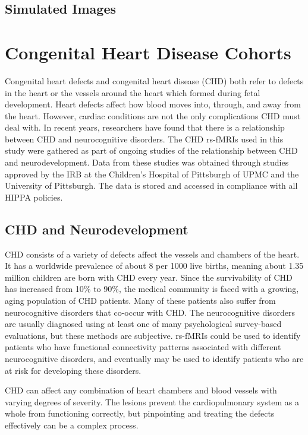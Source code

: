 \subsection{Simulated Images}

\section{Congenital Heart Disease Cohorts}

Congenital heart defects and congenital heart disease (CHD) both refer to defects in the heart or the vessels around the heart which formed during  fetal development. Heart defects affect how blood moves into, through, and away from the heart. However, cardiac conditions are not the only complications CHD must deal with. In recent years, researchers have found that there is a relationship between CHD and neurocognitive disorders. The CHD rs-fMRIs used in this study were gathered as part of ongoing studies of the relationship between CHD and neurodevelopment. Data from these studies was obtained through studies approved by the IRB at the Children's Hospital of Pittsburgh of UPMC and the University of Pittsburgh. The data is stored and accessed in compliance with all HIPPA policies.

\subsection{CHD and Neurodevelopment}

CHD consists of a variety of defects affect the vessels and chambers of the heart. It has a worldwide prevalence of about 8 per 1000 live births, meaning about 1.35 million children are born with CHD every year. Since the survivability of CHD has increased from 10\% to 90\%, the medical community is faced with a growing, aging population of CHD patients. Many of these patients also suffer from neurocognitive disorders that co-occur with CHD. The neurocognitive disorders are usually diagnosed using at least one of many psychological survey-based evaluations, but these methods are subjective. rs-fMRIs could be used to identify patients who have functional connectivity patterns associated with different neurocognitive disorders, and eventually may be used to identify patients who are at risk for developing these disorders.

CHD can affect any combination of heart chambers and blood vessels with varying degrees of severity. The lesions prevent the cardiopulmonary system as a whole from functioning correctly, but pinpointing and treating the defects effectively can be a complex process.
 
